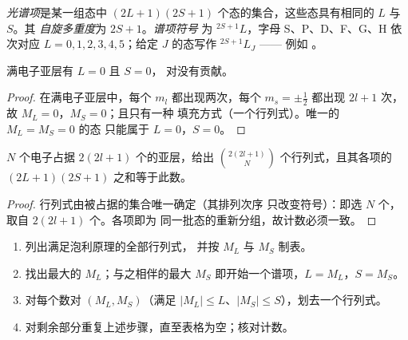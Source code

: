 \begin{definition}\label{def:b3:many-electron-atoms:term}
\emph{光谱项}是某一组态中
$(2L+1)(2S+1)$ 个态的集合，这些态具有相同的 $L$ 与 $S$。其
\emph{自旋多重度}为 $2S + 1$。\emph{谱项符号}
为 ${}^{2S+1}L$，字母 S、P、D、F、G、H
依次对应 $L = 0, 1, 2, 3, 4, 5$；给定 $J$ 的态写作 ${}^{2S+1}L_J$ ——
例如 。
\end{definition}

\begin{proposition}[闭壳层]\label{prop:b3:many-electron-atoms:closed-shell}
满电子亚层有 $L = 0$ 且 $S = 0$，
对没有贡献。
\end{proposition}

\begin{proof}
在满电子亚层中，每个 $m_l$ 都出现两次，每个 $m_s = \pm\frac12$
都出现 $2l+1$ 次，故 $M_L = 0$，$M_S = 0$；且只有一种
填充方式（一个行列式）。唯一的 $M_L = M_S = 0$ 的态
只能属于 $L = 0$，$S = 0$。
\end{proof}

\begin{proposition}[组态态数的计数]\label{prop:b3:many-electron-atoms:count}
$N$ 个电子占据 $2(2l+1)$ 个的亚层，给出
$\binom{2(2l+1)}{N}$ 个行列式，且其各项的 $(2L+1)(2S+1)$
之和等于此数。
\end{proposition}

\begin{proof}
行列式由被占据的集合唯一确定（其排列次序
只改变符号）：即选 $N$ 个，取自 $2(2l+1)$ 个。各项即为
同一批态的重新分组，故计数必须一致。
\end{proof}

\begin{method}[组态的谱项]\label{met:b3:many-electron-atoms:terms}
\begin{enumerate}
  \item 列出满足泡利原理的全部行列式，
        并按 $M_L$ 与 $M_S$ 制表。
  \item 找出最大的 $M_L$；与之相伴的最大 $M_S$
        即开始一个谱项，$L = M_L$，$S = M_S$。
  \item 对每个数对 $(M_L, M_S)$（满足
        $|M_L| \le L$、$|M_S| \le S$），划去一个行列式。
  \item 对剩余部分重复上述步骤，直至表格为空；核对计数。
\end{enumerate}
\end{method}

